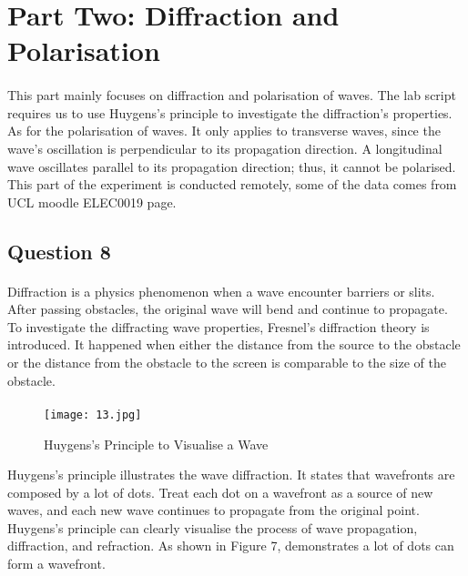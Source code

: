 \documentclass[12pt]{article}
\begin{document}
    
    \section{Part Two: Diffraction and Polarisation}
    \paragraph{}
    This part mainly focuses on diffraction and polarisation of waves. The lab script requires us to use Huygens's principle to investigate the diffraction's properties. As for the polarisation of waves. It only applies to transverse waves, since the wave's oscillation is perpendicular to its propagation direction. A longitudinal wave oscillates parallel to its propagation direction; thus, it cannot be polarised. This part of the experiment is conducted remotely, some of the data comes from UCL moodle ELEC0019 page. 
    
    
    \subsection{Question 8}
    \paragraph{}
    Diffraction is a physics phenomenon when a wave encounter barriers or slits. After passing obstacles, the original wave will bend and continue to propagate. To investigate the diffracting wave properties, Fresnel's diffraction theory is introduced. It happened when either the distance from the source to the obstacle or the distance from the obstacle to the screen is comparable to the size of the obstacle\cite{7}. 
    
    \paragraph{}
    \begin{figure}[H]
    \centering
    \texttt{[image: 13.jpg]}
    \caption{Huygens's Principle to Visualise a Wave}
    \end{figure}
    Huygens's principle illustrates the wave diffraction. It states that wavefronts are composed by a lot of dots. Treat each dot on a wavefront as a source of new waves, and each new wave continues to propagate from the original point. Huygens's principle can clearly visualise the process of wave propagation, diffraction, and refraction. As shown in Figure 7, demonstrates a lot of dots can form a wavefront.
    
\end{document}
